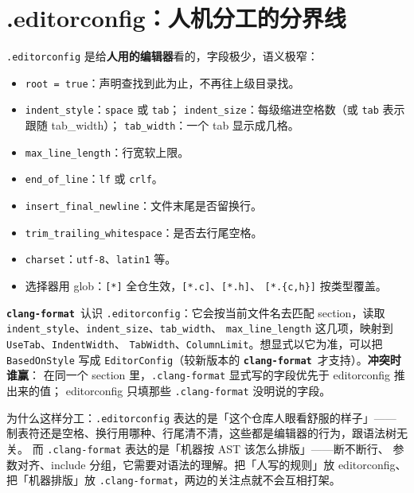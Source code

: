 \documentclass[12pt,a4paper,fontset=fandol]{ctexbook}
\newcommand{\Bk}{\discretionary{}{}{}}
\newcommand{\Lib}[1]{\textbf{\texttt{#1}}}
\newcommand{\Fmt}{\Lib{clang-format}}
\begin{document}
\section{.editorconfig：人机分工的分界线}\label{sec:ch07-s5}

\texttt{.editorconfig} 是给\textbf{人用的编辑器}看的，字段极少，语义极窄：

\begin{itemize}
  \item \texttt{root = true}：声明查找到此为止，不再往上级目录找。
  \item \texttt{indent\_style}：\texttt{space} 或 \texttt{tab}；
        \texttt{indent\_size}：每级缩进空格数（或 \texttt{tab} 表示跟随 tab\_width）；
        \texttt{tab\_width}：一个 tab 显示成几格。
  \item \texttt{max\_line\_length}：行宽软上限。
  \item \texttt{end\_{\Bk}of\_{\Bk}line}：\texttt{lf} 或 \texttt{crlf}。
  \item \texttt{insert\_{\Bk}final\_{\Bk}newline}：文件末尾是否留换行。
  \item \texttt{trim\_{\Bk}trailing\_{\Bk}whitespace}：是否去行尾空格。
  \item \texttt{charset}：\texttt{utf-8}、\texttt{latin1} 等。
  \item 选择器用 glob：\texttt{[*]} 全仓生效，\texttt{[*.c]}、\texttt{[*.h]}、
        \texttt{[*.\{c,h\}]} 按类型覆盖。
\end{itemize}

\Fmt\ 认识 \texttt{.editorconfig}：它会按当前文件名去匹配 section，读取
\texttt{indent\_{\Bk}style}、\texttt{indent\_{\Bk}size}、\texttt{tab\_width}、
\texttt{max\_{\Bk}line\_{\Bk}length} 这几项，映射到 \texttt{UseTab}、\texttt{IndentWidth}、
\texttt{TabWidth}、\texttt{ColumnLimit}。想显式以它为准，可以把 \texttt{Based{\Bk}On{\Bk}Style}
写成 \texttt{Editor{\Bk}Config}（较新版本的 \Fmt\ 才支持）。\textbf{冲突时谁赢}：
在同一个 section 里，\texttt{.clang-{\Bk}format} 显式写的字段优先于 editorconfig 推出来的值；
editorconfig 只填那些 \texttt{.clang-{\Bk}format} 没明说的字段。

为什么这样分工：\texttt{.editorconfig} 表达的是「这个仓库人眼看舒服的样子」——
制表符还是空格、换行用哪种、行尾清不清，这些都是编辑器的行为，跟语法树无关。
而 \texttt{.clang-format} 表达的是「机器按 AST 该怎么排版」——断不断行、
参数对齐、include 分组，它需要对语法的理解。把「人写的规则」放 editorconfig、
把「机器排版」放 \texttt{.clang-format}，两边的关注点就不会互相打架。
\end{document}
